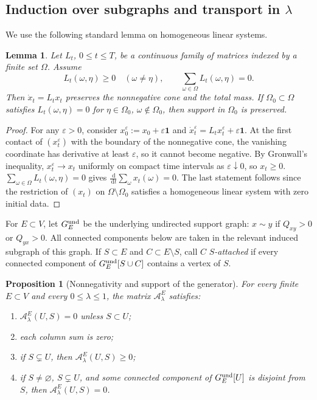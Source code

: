 \documentclass[11pt]{article}
\numberwithin{equation}{section}
\newcommand{\1}{\mathbf{1}}
\newtheorem{lemma}[theorem]{Lemma}
\newtheorem{proposition}[theorem]{Proposition}
\newcommand{\one}{\mathbf 1}
\newcommand{\dd}{\,\mathrm d}
\newcommand{\Ac}{\mathcal A}
\begin{document}
\subsection{Induction over subgraphs and transport in \texorpdfstring{\(\lambda\)}{lambda}}
\label{subsec:transport}

We use the following standard lemma on homogeneous linear systems.
\begin{lemma}\label{lem:cone-invariance}
Let \(L_t\), \(0\le t\le T\), be a continuous family of matrices indexed by a
finite set \(\Omega\).  Assume
\[
        L_t(\omega,\eta)\ge0\quad(\omega\ne\eta),
        \qquad
        \sum_{\omega\in\Omega}L_t(\omega,\eta)=0 .
\]
Then \(\dot x_t=L_tx_t\) preserves the nonnegative cone and the total mass.
If \(\Omega_0\subset\Omega\) satisfies
\(L_t(\omega,\eta)=0\) for \(\eta\in\Omega_0\), \(\omega\notin\Omega_0\),
then support in \(\Omega_0\) is preserved.
\end{lemma}

\begin{proof}
For any $\varepsilon>0$, consider
\(x_0^\varepsilon:=x_0+\varepsilon\one\) and
\(\dot x_t^\varepsilon=L_tx_t^\varepsilon+\varepsilon\one\). At the first contact of $(x_t^\varepsilon)$ with the boundary of the nonnegative cone, the vanishing
coordinate has derivative at least $\varepsilon$, so it cannot become negative. By Gronwall's inequality, $x_t^\varepsilon\to x_t$ uniformly on compact time intervals as $\varepsilon\downarrow0$, so $x_t\ge0$. $\sum_{\omega\in\Omega}L_t(\omega,\eta)=0$ gives
\(\frac{\dd}{\dd t}\sum_\omega x_t(\omega)=0\). The last statement follows since the restriction of $(x_t)$ on $\Omega\setminus\Omega_0$ satisfies a
homogeneous linear system with zero initial data.
\end{proof}

For \(E\subset V\), let \(G_E^{\rm und}\) be the underlying undirected
support graph: \(x\sim y\) if \(Q_{xy}>0\) or \(Q_{yx}>0\). All connected
components below are taken in the relevant induced subgraph of this graph.
If \(S\subset E\) and \(C\subset E\setminus S\), call \(C\)
\emph{\(S\)-attached} if every connected component of
\(G_E^{\rm und}[S\cup C]\) contains a vertex of \(S\).

\begin{proposition}[Nonnegativity and support of the generator]\label{prop:positive-generator}
For every finite \(E\subset V\) and every \(0\le\lambda\le1\), the matrix
\(\Ac_\lambda^E\) satisfies:
\begin{enumerate}[label=\textup{(\roman*)},leftmargin=2.2em]
\item \(\Ac_\lambda^E(U,S)=0\) unless \(S\subset U\);
\item each column sum is zero;
\item if \(S\subsetneq U\), then \(\Ac_\lambda^E(U,S)\ge0\);
\item if \(S\ne\varnothing\), \(S\subsetneq U\), and some connected component
of \(G_E^{\rm und}[U]\) is disjoint from \(S\), then
\(\Ac_\lambda^E(U,S)=0\).
\end{enumerate}
\end{proposition}
\end{document}
